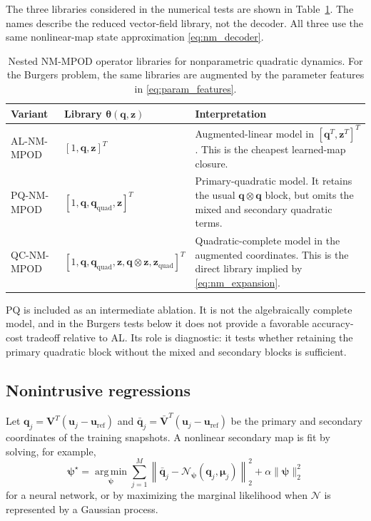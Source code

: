 \documentclass[11pt]{article}
\newcommand{\bu}{\mathbf u}
\newcommand{\bq}{\boldsymbol q}
\newcommand{\bz}{\boldsymbol z}
\newcommand{\bmu}{\boldsymbol\mu}
\newcommand{\btheta}{\boldsymbol\theta}
\newcommand{\bV}{\mathbf V}
\newcommand{\bVbar}{\bar{\mathbf V}}
\newcommand{\qbar}{\bar{\boldsymbol q}}
\newcommand{\uref}{\mathbf u_{\mathrm{ref}}}
\newcommand{\Nmap}{\mathcal{N}}
\newcommand{\argmin}{\operatorname*{arg\,min}}
\begin{document}
The three libraries considered in the numerical tests are shown in
Table~\ref{tab:libraries}.  The names describe the reduced vector-field
library, not the decoder.  All three use the same nonlinear-map state
approximation \eqref{eq:nm_decoder}.

\begin{table}[!htbp]
\centering
\caption{Nested NM-MPOD operator libraries for nonparametric quadratic dynamics.
For the Burgers problem, the same libraries are augmented by the parameter
features in \eqref{eq:param_features}.}
\label{tab:libraries}
\begin{tabularx}{\textwidth}{p{}p{}X}
\toprule
Variant & Library $\btheta(\bq,\bz)$ & Interpretation\\
\midrule
AL-NM-MPOD &
$[1,\bq,\bz]^T$ &
Augmented-linear model in $[\bq^T,\bz^T]^T$.  This is the cheapest learned-map
closure.\\
PQ-NM-MPOD &
$[1,\bq,\bq_{\mathrm{quad}},\bz]^T$ &
Primary-quadratic model.  It retains the usual $\bq\otimes\bq$ block, but omits
the mixed and secondary quadratic terms.\\
QC-NM-MPOD &
$[1,\bq,\bq_{\mathrm{quad}},\bz,\bq\otimes\bz,\bz_{\mathrm{quad}}]^T$ &
Quadratic-complete model in the augmented coordinates.  This is the direct
library implied by \eqref{eq:nm_expansion}.\\
\bottomrule
\end{tabularx}
\end{table}

PQ is included as an intermediate ablation.  It is not the algebraically
complete model, and in the Burgers tests below it does not provide a favorable
accuracy-cost tradeoff relative to AL.  Its role is diagnostic: it tests whether
retaining the primary quadratic block without the mixed and secondary blocks is
sufficient.

\subsection{Nonintrusive regressions}

Let $\bq_j=\bV^T(\bu_j-\uref)$ and
$\qbar_j=\bVbar^T(\bu_j-\uref)$ be the primary and secondary coordinates of the
training snapshots.  A nonlinear secondary map is fit by solving, for example,
\begin{equation}
  \boldsymbol\psi^\star
  =
  \argmin_{\boldsymbol\psi}
  \sum_{j=1}^{M}
  \left\|
  \qbar_j-\Nmap_{\boldsymbol\psi}(\bq_j,\bmu_j)
  \right\|_2^2
  +\alpha\|\boldsymbol\psi\|_2^2
  \label{eq:ann_fit}
\end{equation}
for a neural network, or by maximizing the marginal likelihood when
$\Nmap$ is represented by a Gaussian process.
\end{document}
